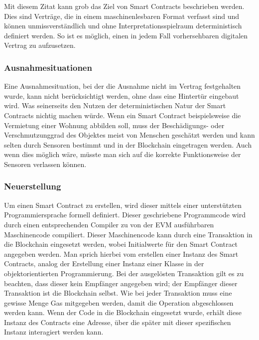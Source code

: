 Mit diesem Zitat kann grob das Ziel von Smart Contracts beschrieben werden. Dies sind Verträge, die in einem maschinenlesbaren Format verfasst sind und können unmissverständlich und ohne Interpretationsspielraum deterministisch definiert werden. So ist es möglich, einen in jedem Fall vorhersehbaren digitalen Vertrag zu aufzusetzen.

\subsubsection{Ausnahmesituationen}
Eine Ausnahmesituation, bei der die Ausnahme nicht im Vertrag festgehalten wurde, kann nicht berücksichtigt werden, ohne dass eine Hintertür eingebaut wird. Was seinerseits den Nutzen der deterministischen Natur der Smart Contracts nichtig machen würde.
Wenn ein Smart Contract beispielsweise die Vermietung einer Wohnung abbilden soll, muss der Beschädigungs- oder Verschmutzunggrad des Objektes meist von Menschen geschätzt werden und kann selten durch Sensoren bestimmt und in der Blockchain eingetragen werden. Auch wenn dies möglich wäre, müsste man sich auf die korrekte Funktionsweise der Sensoren verlassen können.\cite{ibtimes.co.uk/abiguity}

\subsubsection{Neuerstellung}
\label{subsubsec:Neuerstellung}
Um einen Smart Contract zu erstellen, wird dieser mittels einer unterstützten Programmiersprache formell definiert. Dieser geschriebene Programmcode wird durch einen entsprechenden Compiler zu von der EVM ausführbaren Maschinencode compiliert. Dieser Maschinencode kann durch eine Transaktion in die Blockchain eingesetzt werden, wobei Initialwerte für den Smart Contract angegeben werden. Man sprich hierbei vom erstellen einer Instanz des Smart Contracts, analog der Erstellung einer Instanz einer Klasse in der objektorientierten Programmierung. Bei der ausgelösten Transaktion gilt es zu beachten, dass dieser kein Empfänger angegeben wird; der Empfänger dieser Transaktion ist die Blockchain selbst. Wie bei jeder Transaktion muss eine gewisse Menge Gas mitgegeben werden, damit die Operation abgeschlossen werden kann. Wenn der Code in die Blockchain eingesetzt wurde, erhält diese Instanz des Contracts eine Adresse, über die später mit dieser spezifischen Instanz interagiert werden kann.\cite[Solidity in Depth/Contracts/Creating Contracts]{solidity.readthedocs.io}

